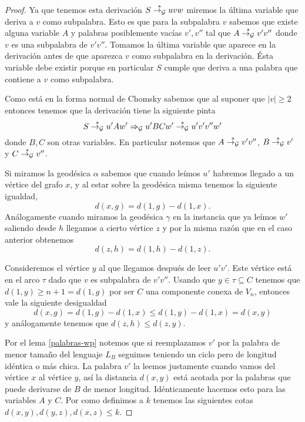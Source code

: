 \documentclass[tesis.tex]{subfiles}
\begin{document}
\begin{proof}
	Ya que tenemos esta derivación $S \overset{*}{\to_{\cal G}} uvw$ miremos la última variable que deriva a $v$ como subpalabra. 
	Esto es que para la subpalabra $v$ sabemos que existe alguna variable $A$ y palabras posiblemente vacías $v',v''$ tal que $A \overset{*}{\to_{\cal G}} v'v''$ donde $v$ es una subpalabra de $v'v''$. 
	Tomamos la última variable que aparece en la derivación antes de que aparezca $v$ como subpalabra en la derivación.
	Ésta variable debe existir porque en particular $S$ cumple que deriva a una palabra que contiene a $v$ como subpalabra.
	
	Como está en la forma normal de Chomsky sabemos que al suponer que $|v| \ge 2$ entonces tenemos que la derivación tiene la siguiente pinta
	\begin{equation*}
		S \overset{*}{\to_{\cal G}} u'Aw' \Rightarrow_{\cal G} u'BC w' \overset{*}{\to_{\cal G}} u'v'v''w'
	\end{equation*}
	donde $B,C$ son otras variables. 
	En particular notemos que $A \overset{*}{\to_{\cal G}} v'v''$, $B \overset{*}{\to_{\cal G}} v'$ y $C \overset{*}{\to_{\cal G}} v''$.
	
	
	Si miramos la geodésica $\alpha$ sabemos que cuando leímos $u'$ habremos llegado a un vértice del grafo $x$, y al estar sobre la geodésica misma tenemos la siguiente igualdad,
	\begin{equation*}
		d(x,g) = d(1,g) - d(1,x).
	\end{equation*}
	Análogamente cuando miramos la geodésica $\gamma$ en la instancia que ya leímos $w'$ saliendo desde $h$ llegamos a cierto vértice $z$ y por la misma razón que en el caso anterior obtenemos
	\begin{equation*}
		d(z,h) = d(1,h) - d(1,z).
	\end{equation*}

	Consideremos el vértice $y$ al que llegamos después de leer $u'v'$.
	Este vértice está en el arco $\tau$ dado que $v$ es subpalabra de $v'v''$.
	Usando que $y \in \tau \subseteq C $ tenemos que $d(1,y) \ge n+1 = d(1,g)$ por ser $C$ una componente conexa de $V_n$, entonces vale la siguiente desigualdad
	\begin{equation*}
		d(x,g) = d(1,g) - d(1,x) \le d(1,y) - d(1,x) = d(x,y)
	\end{equation*}
	y análogamente tenemos que $d(z,h) \le d(z,y)$.
	
	
	Por el lema \ref{palabras-wp} notemos que si reemplazamos $v'$ por la palabra de menor tamaño del lenguaje $L_B$ seguimos teniendo un ciclo pero de longitud idéntica o más chica. 
	La palabra $v'$ la leemos justamente cuando vamos del vértice $x$ al vértice $y$, así la distancia  $d(x,y)$ está acotada por la palabras que puede derivarse de $B$ de menor longitud. 
	Idénticamente hacemos esto para las variables $A$ y $C$.
	Por como definimos a $k$ tenemos las siguientes cotas $d(x,y), d(y,z), d(x,z) \le k$.



\end{proof}
\end{document}
